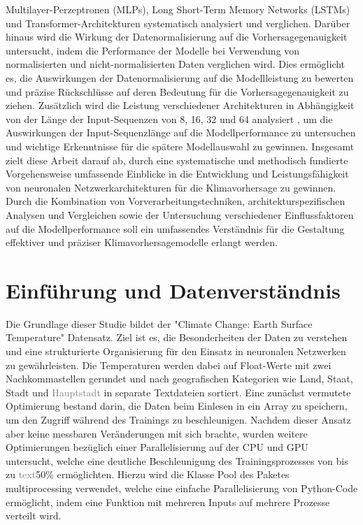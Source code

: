 \documentclass[manuscript,screen,review]{acmart}
\begin{document}
Multilayer-Perzeptronen (MLPs), Long Short-Term Memory Networks (LSTMs) und Transformer-Architekturen systematisch analysiert und verglichen.
Darüber hinaus wird die Wirkung der Datenormalisierung auf die Vorhersagegenauigkeit untersucht, 
indem die Performance der Modelle bei Verwendung von normalisierten und nicht-normalisierten Daten verglichen wird. 
Dies ermöglicht es, die Auswirkungen der Datenormalisierung auf die Modellleistung zu bewerten 
und präzise Rückschlüsse auf deren Bedeutung für die Vorhersagegenauigkeit zu ziehen.
Zusätzlich wird die Leistung verschiedener Architekturen in Abhängigkeit von der Länge der Input-Sequenzen 
von 8, 16, 32 und 64 analysiert , 
um die Auswirkungen der Input-Sequenzlänge auf die Modellperformance zu untersuchen 
und wichtige Erkenntnisse für die spätere Modellauswahl zu gewinnen.
Insgesamt zielt diese Arbeit darauf ab, durch eine systematische und methodisch fundierte Vorgehensweise 
umfassende Einblicke in die Entwicklung und Leistungsfähigkeit von neuronalen Netzwerkarchitekturen für die Klimavorhersage zu gewinnen. Durch die Kombination von Vorverarbeitungstechniken, architekturspezifischen Analysen und Vergleichen sowie der Untersuchung verschiedener Einflussfaktoren auf die Modellperformance soll ein umfassendes Verständnis für die Gestaltung effektiver und präziser Klimavorhersagemodelle erlangt werden.

\section{Einführung und Datenverständnis}
Die Grundlage dieser Studie bildet der "Climate Change: Earth Surface Temperature" Datensatz. 
Ziel ist es, die Besonderheiten der Daten zu verstehen und eine strukturierte Organisierung für den Einsatz in neuronalen Netzwerken zu gewährleisten. 
Die Temperaturen werden dabei auf Float-Werte mit zwei Nachkommastellen gerundet und nach geografischen Kategorien wie Land, Staat, Stadt und \textcolor{gray}{Hauptstadt} in separate Textdateien sortiert. 
Eine zunächst vermutete Optimierung bestand darin, die Daten beim Einlesen in ein Array zu speichern, um den Zugriff während des Trainings zu beschleunigen.
Nachdem dieser Ansatz aber keine messbaren Veränderungen mit sich brachte, wurden weitere Optimierungen bezüglich einer Parallelisierung auf der CPU und GPU untersucht, 
welche eine deutliche Beschleunigung des Trainingsprozesses von bis zu \textcolor{gray}{text}{50\%} ermöglichten. 
Hierzu wird die Klasse Pool des Paketes multiprocessing verwendet, welche eine einfache Parallelisierung von Python-Code ermöglicht, indem eine Funktion mit mehreren Inputs auf mehrere Prozesse verteilt wird.
\end{document}
